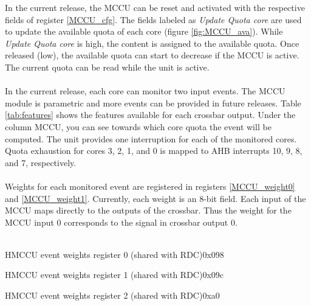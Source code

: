 In the current release, the MCCU can be reset and activated with the respective fields of register \ref{MCCU_cfg}. The fields labeled as \textit{Update Quota core} are used to update the available quota of each core (figure \ref{fig:MCCU_ava}). While  \textit{Update Quota core} is high, the content is assigned to the available quota. Once released (low), the available quota can start to decrease if the MCCU is active. The current quota can be read while the unit is active.\\
\\
In the current release, each core can monitor two input events. The MCCU module is parametric and more events can be provided in future releases.  Table \ref{tab:features} shows the features available for each crossbar output. Under the column MCCU, you can see towards which core quota the event will be computed.
The unit provides one interruption for each of the monitored cores. Quota exhaustion for cores 3, 2, 1, and 0 is mapped to AHB interrupts 10, 9, 8, and 7, respectively.\\
\\
Weights for each monitored event are registered in registers \ref{MCCU_weight0} and \ref{MCCU_weight1}. Currently, each weight is an 8-bit field. Each input of the MCCU maps directly to the outputs of the crossbar. Thus the weight for the MCCU input 0 corresponds to the signal in crossbar output 0.\\
\\
\begin{register}{H}{MCCU event weights register 0 (shared with RDC)}{0x098}
	\label{MCCU_weight0}
	\regnewline
\end{register}
\begin{register}{H}{MCCU event weights register 1 (shared with RDC)}{0x09c}
	\label{MCCU_weight1}
	\regnewline
\end{register}
\begin{register}{H}{MCCU event weights register 2 (shared with RDC)}{0xa0}
	\label{MCCU_weight1}
	\regnewline
\end{register}

